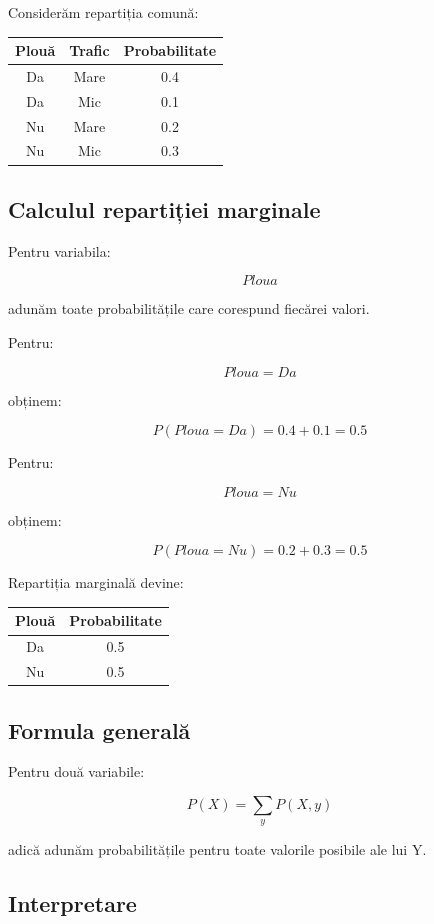 \documentclass[12pt,a4paper]{article}
\begin{document}
Considerăm repartiția comună:

\begin{center}
\begin{tabular}{|c|c|c|}
\hline
Plouă & Trafic & Probabilitate \\
\hline
Da & Mare & 0.4 \\
Da & Mic & 0.1 \\
Nu & Mare & 0.2 \\
Nu & Mic & 0.3 \\
\hline
\end{tabular}
\end{center}

\subsection{Calculul repartiției marginale}

Pentru variabila:

\[
Ploua
\]

adunăm toate probabilitățile care corespund fiecărei valori.

Pentru:

\[
Ploua=Da
\]

obținem:

\[
P(Ploua=Da)=0.4+0.1=0.5
\]

Pentru:

\[
Ploua=Nu
\]

obținem:

\[
P(Ploua=Nu)=0.2+0.3=0.5
\]

Repartiția marginală devine:

\begin{center}
\begin{tabular}{|c|c|}
\hline
Plouă & Probabilitate \\
\hline
Da & 0.5 \\
Nu & 0.5 \\
\hline
\end{tabular}
\end{center}

\subsection{Formula generală}

Pentru două variabile:

\[
P(X)
=
\sum_y P(X,y)
\]

adică adunăm probabilitățile pentru toate valorile posibile ale lui Y.

\subsection{Interpretare}
\end{document}
